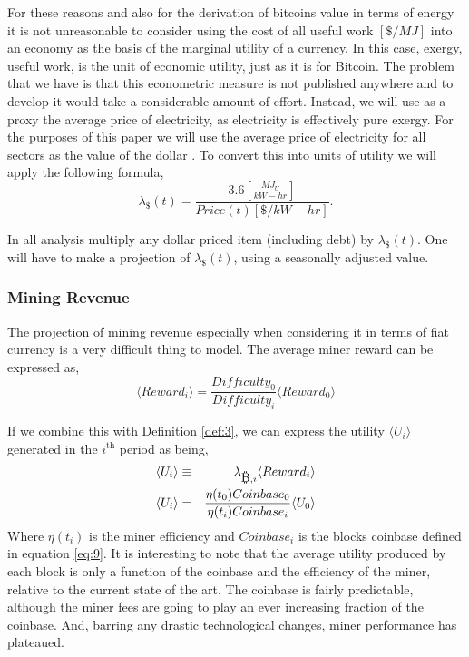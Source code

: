 \documentclass[runningheads]{llncs}
\def\bitcoin{
    \leavevmode
    \vtop{\offinterlineskip %
    \setbox0=\hbox{B}
    \setbox2=\hbox to\wd0{\hfil\hskip-.03em
    \vrule height .3ex width .15ex\hskip .08em
    \vrule height .3ex width .15ex\hfil}
    \vbox{\copy2\box0}\box2}
}
\begin{document}
For these reasons and also for the derivation of bitcoins value in terms of energy it is not unreasonable to consider using the cost of all useful work $[\$/MJ]$ into an economy as the basis of the marginal utility of a currency.
In this case, exergy, useful work, is the unit of economic utility, just as it is for Bitcoin.
The problem that we have is that this econometric measure is not published anywhere and to develop it would take a considerable amount of effort.
Instead, we will use as a proxy the average price of electricity, as electricity is effectively pure exergy.
For the purposes of this paper we will use the average price of electricity for all sectors as the value of the dollar \cite{eia2021browser}.
To convert this into units of utility we will apply the following formula,
\begin{equation}
    \lambda_{\$}(t) = \frac{3.6[\frac{MJ_U}{kW-hr}]}{Price(t)[\$/kW-hr]}.\label{eq:10}
\end{equation}

In all analysis multiply any dollar priced item (including debt) by $\lambda_{\$}(t)$.
One will have to make a projection of $\lambda_{\$}(t)$, using a seasonally adjusted value.

\subsubsection{Mining Revenue}
The projection of mining revenue especially when considering it in terms of fiat currency is a very difficult thing to model.
The average miner reward can be expressed as,
\begin{equation}
    \langle Reward_i \rangle = \frac{Difficulty_0}{Difficulty_i}\langle Reward_0 \rangle
\end{equation}

If we combine this with Definition \ref{def:3}, we can express the utility $\langle U_i \rangle$ generated in the $i^{\mbox{th}}$ period as being,
\begin{eqnarray}
    \langle U_i \rangle &\equiv& \lambda_{\bitcoin, i} \langle Reward_i \rangle \\
    \langle U_i \rangle &=& \frac{\eta(t_0) Coinbase_0}{\eta(t_i)Coinbase_i} \langle U_0 \rangle \\ \label{eq:11}
\end{eqnarray}
Where $\eta(t_i)$ is the miner efficiency and $Coinbase_i$ is the blocks coinbase defined in equation \ref{eq:9}.
It is interesting to note that the average utility produced by each block is only a function of the coinbase and the efficiency of the miner, relative to the current state of the art.
The coinbase is fairly predictable, although the miner fees are going to play an ever increasing fraction of the coinbase.
And, barring any drastic technological changes, miner performance has plateaued.
\end{document}
